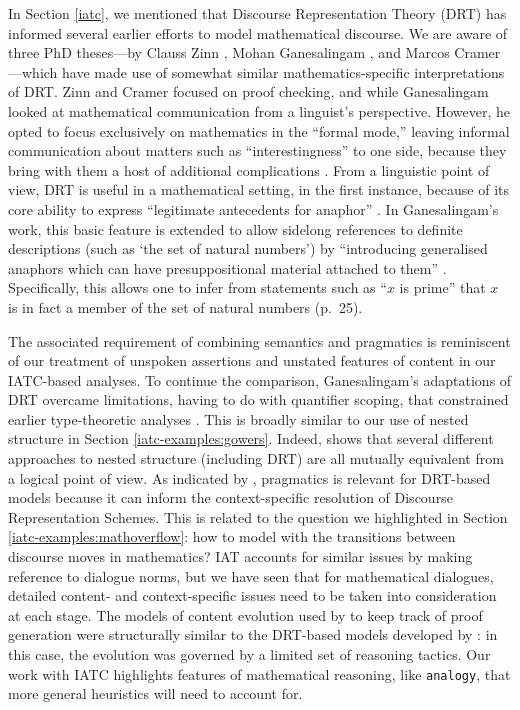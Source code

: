\documentclass[smallextended,oneside]{svjour3}       %
\let\cite\citep
\begin{document}
{In Section \ref{iatc}, we mentioned that Discourse Representation
Theory (DRT) has informed several earlier efforts to model
mathematical discourse.  We are aware of three PhD theses---by Clauss
Zinn \citeyearpar{zinn2004understanding}, Mohan Ganesalingam
\citeyearpar{ganesalingam2013language}, and Marcos Cramer
\citeyearpar{cramer2013proof}---which have made use of somewhat similar
mathematics-specific interpretations of DRT.  Zinn and Cramer
focused on proof checking, and while Ganesalingam looked
at mathematical communication from a linguist's perspective.  However,
he opted to focus exclusively on mathematics in the ``formal mode,''
leaving informal communication about matters such as
``interestingness'' to one side, because they bring with them a
host of additional complications \cite[pp.~7--8]{ganesalingam2013language}.
From a linguistic point of view, DRT is useful in a mathematical setting, in the first instance,
because of its core ability to express ``legitimate antecedents for anaphor''
\cite[p.~50]{ganesalingam2013language}.
In Ganesalingam's work, this basic feature is extended to allow
sidelong references to definite descriptions
(such as `the set of natural numbers')
by ``introducing generalised anaphors which can have presuppositional material
attached to them''
\cite[pp.~25, 237]{ganesalingam2013language}.
Specifically, this allows one to infer from statements such as
``$x$ is prime'' that $x$ is in fact a member of the set of natural numbers (p.~25). 

The associated requirement of combining semantics and pragmatics \cite[p.~336]{doi:10.1093/jos/9.4.333}
is reminiscent of our treatment of unspoken assertions
and unstated features of content in our IATC-based analyses.
To continue the comparison, Ganesalingam's adaptations of DRT
overcame limitations, having to do with quantifier scoping, that constrained
earlier type-theoretic analyses \cite[pp.~81--82]{ganesalingam2013language}.
This is broadly similar to our use of nested structure in Section \ref{iatc-examples:gowers}.
Indeed, \citet{sowa2000knowledge} shows that several different approaches
to nested structure (including DRT)
are all mutually equivalent from a logical point of view.
As indicated by
\citet{doi:10.1093/jos/9.4.333},
pragmatics is relevant for DRT-based models
because it can inform the context-specific resolution of Discourse
Representation Schemes.  This is related to
the question we highlighted in Section \ref{iatc-examples:mathoverflow}:
how to model with the transitions between discourse moves in mathematics?
IAT accounts for similar issues by making reference to dialogue norms,
but we have seen that for mathematical dialogues,
detailed content- and context-specific issues need to be
taken into consideration at each stage.
The models of content evolution used by
\citet{ganesalingam2016fully} to keep track of proof generation were
structurally similar to the DRT-based models developed by
\citet{ganesalingam2013language}: in this case, the evolution was
governed by a limited set of reasoning tactics.  Our work with IATC highlights 
features of mathematical reasoning, like \texttt{analogy}, that more
general heuristics will need to account for.

}
\end{document}
